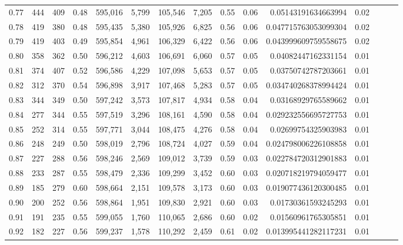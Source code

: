 \begin{tabular}{rrrrrrrrrrrrrrr}
0.77 &     444 &    409 &  0.48 &  595,016 &    5,799 &  105,546 &    7,205 &  0.55 &  0.06 &   0.05143191634663994 &      0.02 \\
0.78 &     419 &    380 &  0.48 &  595,435 &    5,380 &  105,926 &    6,825 &  0.56 &  0.06 &  0.047715763053099304 &      0.02 \\
0.79 &     419 &    403 &  0.49 &  595,854 &    4,961 &  106,329 &    6,422 &  0.56 &  0.06 &  0.043999609759558675 &      0.02 \\
0.80 &     358 &    362 &  0.50 &  596,212 &    4,603 &  106,691 &    6,060 &  0.57 &  0.05 &   0.04082447162331154 &      0.01 \\
0.81 &     374 &    407 &  0.52 &  596,586 &    4,229 &  107,098 &    5,653 &  0.57 &  0.05 &   0.03750742787203661 &      0.01 \\
0.82 &     312 &    370 &  0.54 &  596,898 &    3,917 &  107,468 &    5,283 &  0.57 &  0.05 &  0.034740268378994424 &      0.01 \\
0.83 &     344 &    349 &  0.50 &  597,242 &    3,573 &  107,817 &    4,934 &  0.58 &  0.04 &   0.03168929765589662 &      0.01 \\
0.84 &     277 &    344 &  0.55 &  597,519 &    3,296 &  108,161 &    4,590 &  0.58 &  0.04 &  0.029232556695727753 &      0.01 \\
0.85 &     252 &    314 &  0.55 &  597,771 &    3,044 &  108,475 &    4,276 &  0.58 &  0.04 &   0.02699754325903983 &      0.01 \\
0.86 &     248 &    249 &  0.50 &  598,019 &    2,796 &  108,724 &    4,027 &  0.59 &  0.04 &  0.024798006226108858 &      0.01 \\
0.87 &     227 &    288 &  0.56 &  598,246 &    2,569 &  109,012 &    3,739 &  0.59 &  0.03 &  0.022784720312901883 &      0.01 \\
0.88 &     233 &    287 &  0.55 &  598,479 &    2,336 &  109,299 &    3,452 &  0.60 &  0.03 &  0.020718219794059477 &      0.01 \\
0.89 &     185 &    279 &  0.60 &  598,664 &    2,151 &  109,578 &    3,173 &  0.60 &  0.03 &  0.019077436120300485 &      0.01 \\
0.90 &     200 &    252 &  0.56 &  598,864 &    1,951 &  109,830 &    2,921 &  0.60 &  0.03 &   0.01730361593245293 &      0.01 \\
0.91 &     191 &    235 &  0.55 &  599,055 &    1,760 &  110,065 &    2,686 &  0.60 &  0.02 &   0.01560961765305851 &      0.01 \\
0.92 &     182 &    227 &  0.56 &  599,237 &    1,578 &  110,292 &    2,459 &  0.61 &  0.02 &  0.013995441282117231 &      0.01 \\

\end{tabular}
